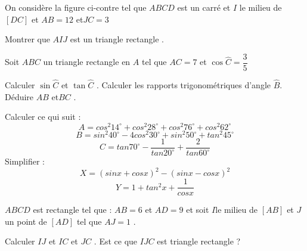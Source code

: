 \documentclass[a4paper,addpoints,12pt]{exam}
\begin{document}
\devoir[ds=false,num=3 ,niv=3 , date=12/11/2022,Rdate=19/11/2022 ]

\begin{exo}
\begin{minipage}{0.6\linewidth}
On considère la figure ci-contre tel que $ABCD$ est un  carré  et $I$ le milieu de $[DC]$ et $AB=12$ et$JC=3$
\begin{questions}
\question Montrer que $AIJ$ est un triangle rectangle .
\end{questions}
\end{minipage}
\begin{minipage}{0.4\linewidth}
\end{minipage}
\end{exo}

\begin{exo}

Soit  $ABC$ un triangle rectangle en $A$ tel que  $AC=7$ et $\cos \widehat{C}=\dfrac{3}{5}$
\begin{questions}
\question Calculer  $\sin \widehat{C}$ et $\tan \widehat{C}$ .
\question Calculer les rapports trigonométriques d'angle $\widehat{B}$.
\question Déduire $AB$ et$BC$ .
\end{questions}
\end{exo}

\begin{exo}
\begin{questions}
\question Calculer ce qui suit :
$$A= cos^{2}14^{\circ}+cos^{2}28^{\circ}+cos^{2}76^{\circ}+cos^{2}62^{\circ}$$
$$B=sin^{2}40^{\circ}-4cos^{2}30^{\circ}+sin^{2}50^{\circ}+tan^{2}45^{\circ}$$
$$C=tan70^{\circ}-\dfrac{1}{tan20^{\circ}}+\dfrac{2}{tan60^{\circ}}$$
\question Simplifier :
$$ X=(sinx+cosx)^{2}-(sinx-cosx)^{2} $$
$$ Y=1+tan^{2}x+\dfrac{1}{cosx}$$
\end{questions}

\end{exo}


\begin{exo}
$ABCD$ est rectangle tel que : $AB=6 $ et  $AD=9 $ et soit  $I$le milieu de $[AB]$ et $J$ un point de  $[AD]$ tel que $AJ=1 $ .
\begin{questions}
\question Calculer  $IJ$ et $IC$ et $JC$ .
\question Est ce que  $IJC$ est triangle rectangle ?
\end{questions}
\end{exo}
\end{document}
